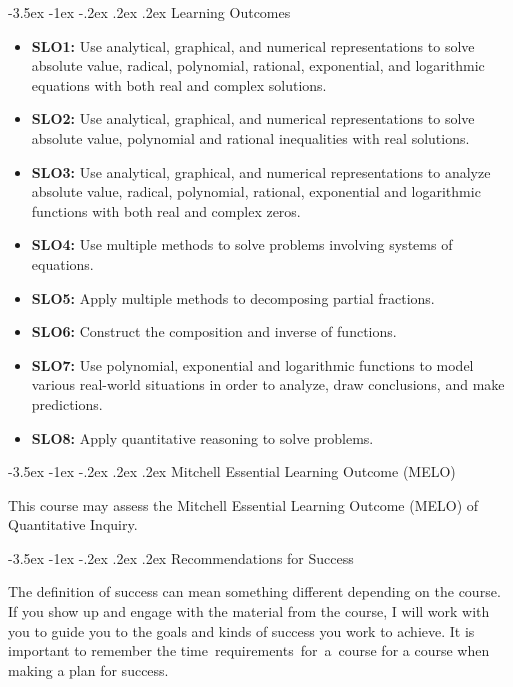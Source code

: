 \documentclass{article}
\makeatletter
\renewcommand\section{\@startsection{section}{1}{0pt}%
  {-3.5ex \@plus -1ex \@minus -.2ex}%
  {.2ex \@plus.2ex}%
  {\normalfont\Large\bfseries}} %
\makeatother
\begin{document}
\section{Learning Outcomes}

\begin{itemize}
\item \textbf{SLO1:} Use analytical, graphical, and numerical representations to solve absolute value, radical, polynomial, rational, exponential, and logarithmic equations with both real and complex solutions.
\item \textbf{SLO2:} Use analytical, graphical, and numerical representations to solve absolute value, polynomial and rational inequalities with real solutions.
\item \textbf{SLO3:} Use analytical, graphical, and numerical representations to analyze absolute value, radical, polynomial, rational, exponential and logarithmic functions with both real and complex zeros.
\item \textbf{SLO4:} Use multiple methods to solve problems involving systems of equations.
\item \textbf{SLO5:} Apply multiple methods to decomposing partial fractions.
\item \textbf{SLO6:} Construct the composition and inverse of functions.
\item \textbf{SLO7:} Use polynomial, exponential and logarithmic functions to model various real-world situations in order to analyze, draw conclusions, and make predictions.
\item \textbf{SLO8:} Apply quantitative reasoning to solve problems.
\end{itemize}

\section{Mitchell Essential Learning Outcome (MELO)}

This course may assess the Mitchell Essential Learning Outcome (MELO) of Quantitative Inquiry.

\section{Recommendations for Success}

The definition of success can mean something different depending on the course. If you show up and engage with the material from the course, I will work with you to guide you to the goals and kinds of success you work to achieve. It is important to remember the time~requirements~for~a~course for a course when making a plan for success.
\end{document}
